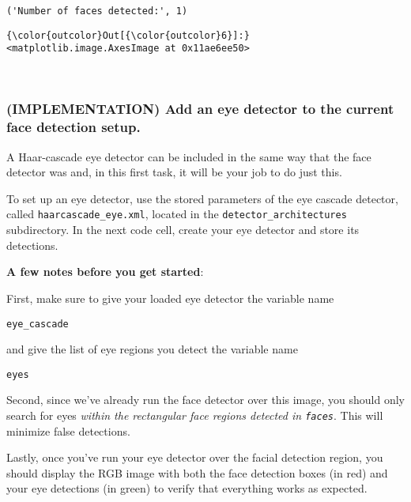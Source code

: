\documentclass[11pt]{article}
\begin{document}
    \begin{Verbatim}[commandchars=\\\{\}]
('Number of faces detected:', 1)

    \end{Verbatim}

\begin{Verbatim}[commandchars=\\\{\}]
{\color{outcolor}Out[{\color{outcolor}6}]:} <matplotlib.image.AxesImage at 0x11ae6ee50>
\end{Verbatim}
            
    \begin{center}
    \end{center}
    { \hspace*{\fill} \\}
    
    \subsubsection{(IMPLEMENTATION) Add an eye detector to the current face
detection
setup.}\label{implementation-add-an-eye-detector-to-the-current-face-detection-setup.}

A Haar-cascade eye detector can be included in the same way that the
face detector was and, in this first task, it will be your job to do
just this.

    To set up an eye detector, use the stored parameters of the eye cascade
detector, called \texttt{haarcascade\_eye.xml}, located in the
\texttt{detector\_architectures} subdirectory. In the next code cell,
create your eye detector and store its detections.

\textbf{A few notes before you get started}:

First, make sure to give your loaded eye detector the variable name

\texttt{eye\_cascade}

and give the list of eye regions you detect the variable name

\texttt{eyes}

Second, since we've already run the face detector over this image, you
should only search for eyes \emph{within the rectangular face regions
detected in \texttt{faces}}. This will minimize false detections.

Lastly, once you've run your eye detector over the facial detection
region, you should display the RGB image with both the face detection
boxes (in red) and your eye detections (in green) to verify that
everything works as expected.
\end{document}
